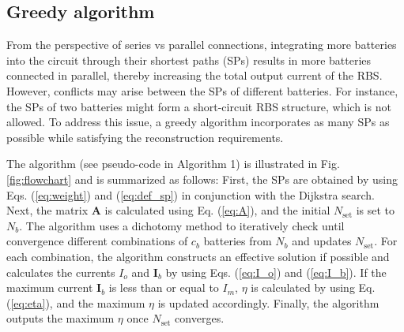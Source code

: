 \documentclass{article}
\begin{document}
\subsection{Greedy algorithm}\label{subsec:greedy_solution}

From the perspective of series vs parallel connections, integrating more batteries into the circuit through their shortest paths (SPs) results in more batteries connected in parallel, thereby increasing the total output current of the RBS.
However, conflicts may arise between the SPs of different batteries. 
For instance, the SPs of two batteries might form a short-circuit RBS structure, which is not allowed. 
To address this issue, a greedy algorithm incorporates as many SPs as possible while satisfying the reconstruction requirements.

The algorithm (see pseudo-code in Algorithm 1) is illustrated in Fig. \ref{fig:flowchart} and is summarized as follows:
First, the SPs are obtained by using Eqs. (\ref{eq:weight}) and (\ref{eq:def_sp}) in conjunction with the Dijkstra search. 
Next, the matrix $\bm{A}$ is calculated using Eq. (\ref{eq:A}), and the initial $N_{\text{set}}$ is set to $N_b$. 
The algorithm uses a dichotomy method to iteratively check until convergence different combinations of $c_b$ batteries from $N_b$ and updates $N_{\text{set}}$. 
For each combination, the algorithm constructs an effective solution if possible and calculates the currents $I_o$ and $\bm{I}_b$ by using Eqs. (\ref{eq:I_o}) and (\ref{eq:I_b}). 
If the maximum current $\bm{I}_b$ is less than or equal to $I_m$, $\eta$ is calculated by using Eq. (\ref{eq:eta}), and the maximum $\eta$ is updated accordingly. 
Finally, the algorithm outputs the maximum $\eta$ once $N_{\text{set}}$ converges.
\end{document}
